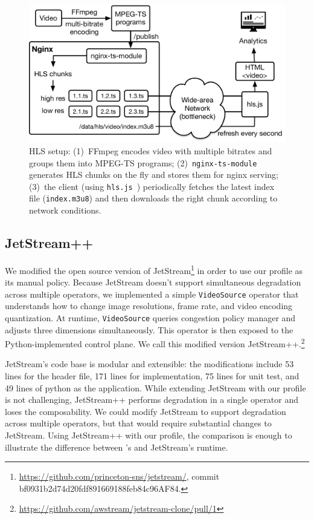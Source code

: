 \begin{figure}[t]
  \centering
  \includegraphics[width=\columnwidth]{figures/hls.pdf}
  \caption{HLS setup: (1)~FFmpeg encodes video with multiple bitrates and groups
    them into MPEG-TS programs;
    (2)~\texttt{nginx-ts-module}~\cite{nginx-ts-module} generates HLS chunks on
    the fly and stores them for nginx serving; (3)~the client (using
    \texttt{hls.js}~\cite{hls.js}) periodically fetches the latest index file
    (\texttt{index.m3u8}) and then downloads the right chunk according to
    network conditions.}
  \label{fig:hls}
\end{figure}

\subsection{JetStream++}
\label{appendix:jetstream++}

We modified the open source version of
JetStream\footnote{\url{https://github.com/princeton-sns/jetstream/}, commit
  bf0931b2d74d20fdf891669188feb84c96AF84.} in order to use our profile as its
manual policy. Because JetStream doesn't support simultaneous degradation across
multiple operators, we implemented a simple \texttt{VideoSource} operator that
understands how to change image resolutions, frame rate, and video encoding
quantization. At runtime, \texttt{VideoSource} queries congestion policy manager
and adjusts three dimensions simultaneously. This operator is then exposed to
the Python-implemented control plane. We call this modified version
JetStream++.\footnote{\url{https://github.com/awstream/jetstream-clone/pull/1}}

JetStream's code base is modular and extensible: the modifications include 53
lines for the header file, 171 lines for implementation, 75 lines for unit test,
and 49 lines of python as the application. While extending JetStream with our
profile is not challenging, JetStream++ performs degradation in a single
operator and loses the composability. We could modify JetStream to support
degradation across multiple operators, but that would require substantial
changes to JetStream. Using JetStream++ with our profile, the comparison is
enough to illustrate the difference between \sysname{}'s and JetStream's
runtime.

